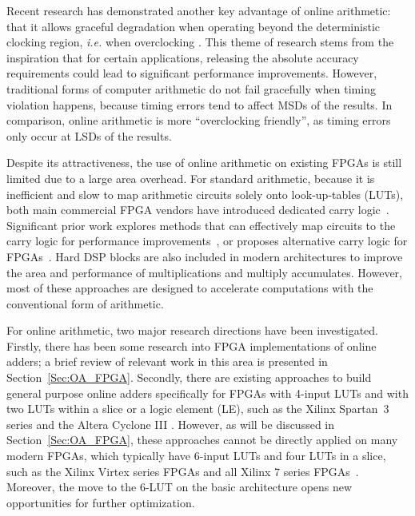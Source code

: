 \documentclass[conference]{IEEEtran}
\begin{document}
Recent research has demonstrated another key advantage of online arithmetic: that it allows graceful degradation when operating beyond the deterministic clocking region,  \textit{i.e.} when overclocking \cite{SKDAC14}. This theme of research stems from the inspiration that for certain applications, releasing the absolute accuracy requirements could lead to significant performance improvements. However, traditional forms of computer arithmetic do not fail gracefully when timing violation happens, because timing errors tend to affect MSDs of the results. In comparison, online arithmetic is more ``overclocking friendly'', as timing errors only occur at LSDs of the results.\vspace{-0.5ex}

Despite its attractiveness, the use of online arithmetic on existing FPGAs is still limited due to a large area overhead. For standard arithmetic, because it is inefficient and slow to map arithmetic circuits solely onto look-up-tables (LUTs), both main commercial FPGA vendors have introduced dedicated carry logic~\cite{Virtex6}. Significant prior work explores methods that can effectively map circuits to the carry logic for performance improvements~\cite{FPL10_FPGA_CarryChain}, or proposes alternative carry logic for FPGAs~\cite{FPGA_CarryChain_New1,FPGA_CarryChain_New2}. Hard DSP blocks are also included in modern architectures to improve the area and performance of multiplications and multiply accumulates. However, most of these approaches are designed to accelerate computations with the conventional form of arithmetic.\vspace{-0.5ex}

For online arithmetic, two major research directions have been investigated. Firstly, there has been some research into FPGA implementations of online adders; a brief review of relevant work in this area is presented in Section~\ref{Sec:OA_FPGA}. Secondly, there are existing approaches to build general purpose online adders specifically for FPGAs with 4-input LUTs and with two LUTs within a slice or a logic element (LE), such as the Xilinx Spartan~3 series \cite{XilinxSpartan} and the Altera Cyclone III \cite{AlteraCyclone}. However, as will be discussed in Section~\ref{Sec:OA_FPGA}, these approaches cannot be directly applied on many modern FPGAs, which typically have 6-input LUTs and four LUTs in a slice, such as the Xilinx Virtex series FPGAs and all Xilinx 7 series FPGAs~\cite{Virtex7}. Moreover, the move to the 6-LUT on the basic architecture opens new opportunities for further optimization.\vspace{-0.5ex}
\end{document}
